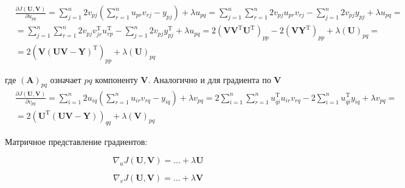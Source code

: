 	\begin{equation}
	\begin{split}
	&\frac{\partial J(\mathbf{U}, \mathbf{V})}{\partial u_{pq}} = \sum\limits_{j=1}^{n}2v_{pj} (\sum\limits_{r=1}^{n}u_{pr}v_{rj}-y_{pj}) + \lambda u_{pq} =\sum\limits_{j=1}^{n} \sum\limits_{r=1}^{n} 2v_{pj} u_{pr}v_{rj}-\sum\limits_{j=1}^{n} 2v_{pj} y_{pj} + \lambda u_{pq}= \\
	&=\sum\limits_{j=1}^{n} \sum\limits_{r=1}^{n} 2v_{pj}v_{jr}^\text{T} u_{rp}^\text{T}-\sum\limits_{j=1}^{n} 2v_{pj} y_{pj}^\text{T} + \lambda u_{pq} = 2(\mathbf{V}\mathbf{V}^\text{T}\mathbf{U}^\text{T})_{pp} - 2(\mathbf{V}\mathbf{Y}^\text{T})_{pp} + \lambda (\mathbf{U})_{pq}= \\
	&= 2 (\mathbf{V} (\mathbf{U}\mathbf{V} - \mathbf{Y})^\text{T})_{pp} + \lambda (\mathbf{U})_{pq} 
	\end{split}
	\end{equation}
	
	где $(\mathbf{A})_{pq}$ означает $pq$ компоненту $\mathbf{V}$. Аналогично и для градиента по $\mathbf{V}$
	\begin{equation}
	\begin{split}
	&\frac{\partial J(\mathbf{U}, \mathbf{V})}{\partial v_{pq}} = \sum\limits_{i=1}^{n}2u_{iq} (\sum\limits_{r=1}^{n}u_{ir}v_{rq}-y_{iq}) + \lambda v_{pq} = 2\sum\limits_{i=1}^{n} \sum\limits_{r=1}^{n} u_{qi}^\text{T} u_{ir}v_{rq}- 2\sum\limits_{i=1}^{n} u_{qi}^\text{T} y_{iq} + \lambda v_{pq} = \\
	&= 2 (\mathbf{U}^\text{T} (\mathbf{U}\mathbf{V} - \mathbf{Y}))_{qq} + \lambda (\mathbf{V})_{pq}  
	\end{split}
	\end{equation}
	
	Матричное представление градиентов:
	
	
	\begin{equation}
	\nabla_u J(\mathbf{U}, \mathbf{V}) = ... + \lambda \mathbf{U}
	\end{equation}
	
	
	\begin{equation}
	\nabla_v J(\mathbf{U}, \mathbf{V}) = ...+ \lambda \mathbf{V}
	\end{equation}
	
	\subsection{}
	
	
